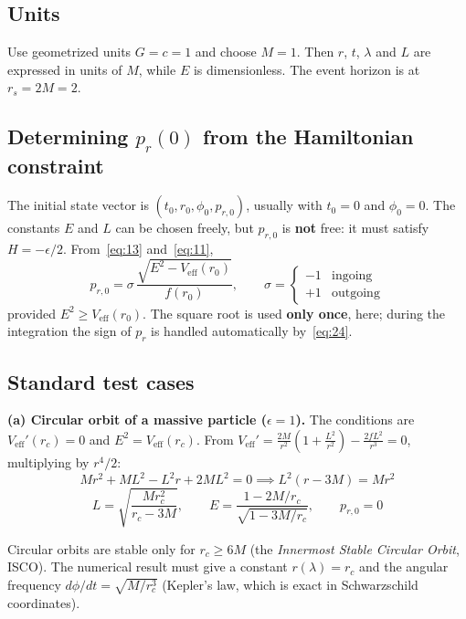 \documentclass[11pt,a4paper]{article}
\newcommand{\Veff}{V_{\text{eff}}}
\begin{document}
\subsection{Units}

Use geometrized units $G = c = 1$ and choose $M = 1$. Then $r$, $t$, $\lambda$ and $L$ are expressed in units of $M$, while $E$ is dimensionless. The event horizon is at $r_s = 2M = 2$.

\subsection{Determining \texorpdfstring{$p_r(0)$}{p\_r(0)} from the Hamiltonian constraint}

The initial state vector is $\left(t_0, r_0, \phi_0, p_{r,0}\right)$, usually with $t_0 = 0$ and $\phi_0 = 0$. The constants $E$ and $L$ can be chosen freely, but $p_{r,0}$ is \textbf{not} free: it must satisfy $H = -\epsilon/2$. From~\eqref{eq:13} and~\eqref{eq:11},
\begin{equation*}
p_{r,0} = \sigma\, \frac{\sqrt{E^2 - \Veff(r_0)}}{f(r_0)}, \qquad \sigma = \begin{cases} -1 & \text{ingoing} \\ +1 & \text{outgoing} \end{cases} \tag{28}\label{eq:28}
\end{equation*}
provided $E^2 \geq \Veff(r_0)$. The square root is used \textbf{only once}, here; during the integration the sign of $p_r$ is handled automatically by~\eqref{eq:24}.

\subsection{Standard test cases}

\textbf{(a) Circular orbit of a massive particle ($\epsilon = 1$).} The conditions are $\Veff'(r_c) = 0$ and $E^2 = \Veff(r_c)$. From $\Veff' = \frac{2M}{r^2}\left(1 + \frac{L^2}{r^2}\right) - \frac{2 f L^2}{r^3} = 0$, multiplying by $r^4/2$:
\begin{equation*}
M r^2 + M L^2 - L^2 r + 2ML^2 = 0 \implies L^2 (r - 3M) = M r^2
\end{equation*}
\begin{equation*}
L = \sqrt{\frac{M r_c^2}{r_c - 3M}}, \qquad
E = \frac{1 - 2M/r_c}{\sqrt{1 - 3M/r_c}}, \qquad
p_{r,0} = 0 \tag{29}\label{eq:29}
\end{equation*}

Circular orbits are stable only for $r_c \geq 6M$ (the \emph{Innermost Stable Circular Orbit}, ISCO). The numerical result must give a constant $r(\lambda) = r_c$ and the angular frequency $d\phi/dt = \sqrt{M/r_c^3}$ (Kepler's law, which is exact in Schwarzschild coordinates).
\end{document}
